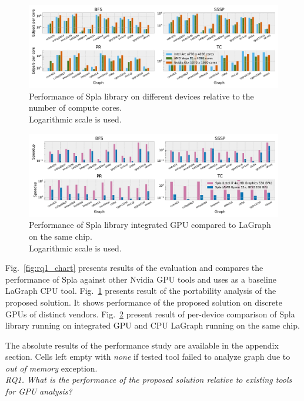 \begin{figure}[tbp]
\centering
\includegraphics[width=1.0\linewidth]{plots/rq2_cores.pdf}
\caption{Performance of Spla library on different devices relative to the number of compute cores.\\Logarithmic scale is used.}
\label{fig:rq2_chart}
\end{figure}

\begin{figure}[tbp]
\centering
\includegraphics[width=1.0\linewidth]{plots/rq3_int.pdf}
\caption{Performance of Spla library integrated GPU compared to LaGraph on the same chip.\\Logarithmic scale is used.}
\label{fig:rq3_chart}
\end{figure}

Fig.~\ref{fig:rq1_chart} presents results of the evaluation and compares the performance of Spla against other Nvidia GPU tools and uses as a baseline LaGraph CPU tool. 
Fig.~\ref{fig:rq2_chart} presents result of the portability analysis of the proposed solution. It shows performance of the proposed solution on discrete GPUs of distinct vendors.
Fig.~\ref{fig:rq3_chart} present result of per-device comparison of Spla library running on integrated GPU and CPU LaGraph running on the same chip. 

The absolute results of the performance study are available in the appendix section. Cells left empty with \textit{none} if tested tool failed to analyze graph due to \textit{out of memory} exception.\\

\textit{RQ1. What is the performance of the proposed solution relative to existing tools for GPU analysis?}\\

